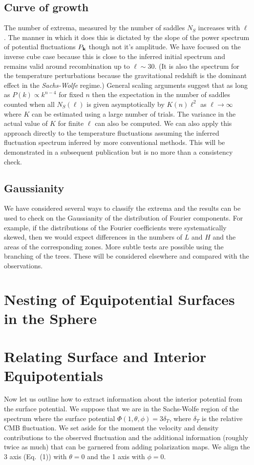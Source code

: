 \documentclass[12pt]{article}
\begin{document}
\subsection{Curve of growth}
The number of extrema, measured by the number of saddles $N_S$ increases with $\ell$. The manner in which it does this is dictated by the slope of the power spectrum of potential fluctuations $P_{\bf k}$ though not it's amplitude. We have focused on the inverse cube case because this is close to the inferred initial spectrum and remains valid around recombination up to $\ell\sim30$. (It is also the spectrum for the temperature perturbations because the gravitational redshift is the dominant effect in the \emph{Sachs-Wolfe} regime.) General scaling arguments suggest that as long as $P(k)\propto k^{n-4}$ for fixed $n$ then the expectation in the number of saddles counted when all $N_S(\ell)$ is given asymptotically by $K(n)\ell^2$ as $\ell\rightarrow\infty$ where $K$ can be estimated using a large number of  trials. The variance in the actual value of $K$ for finite $\ell$ can also be computed. We can also apply this approach directly to the temperature fluctuations assuming the inferred fluctuation spectrum inferred by more conventional methods. This will be demonstrated in a subsequent publication but is no more than a consistency check. 

\subsection{Gaussianity}
We have considered several ways to classify the extrema and the results can be used to check on the Gaussianity of the distribution of Fourier components. For example, if the distributions of the Fourier coefficients were systematically skewed, then we would expect differences in the numbers of $L$ and $H$ and the areas of the corresponding zones. More subtle tests are possible using the branching of the trees. These will be considered elsewhere and compared with the observations.

\section{Nesting of Equipotential Surfaces in the Sphere}

\section{Relating Surface and Interior Equipotentials}
Now let us outline how to extract information about the interior potential from the surface potential. We suppose that we are in the Sachs-Wolfe region of the spectrum where the surface potential $\Phi(1,\theta,\phi)=3\delta_T$, where $\delta_T$ is the relative CMB fluctuation. We set aside for the moment the velocity and density contributions to the observed fluctuation and the additional information (roughly twice as much) that can be garnered from adding  polarization maps. We align the 3 axis (Eq.~(1)) with $\theta=0$ and the 1 axis with $\phi=0$. 
\end{document}
